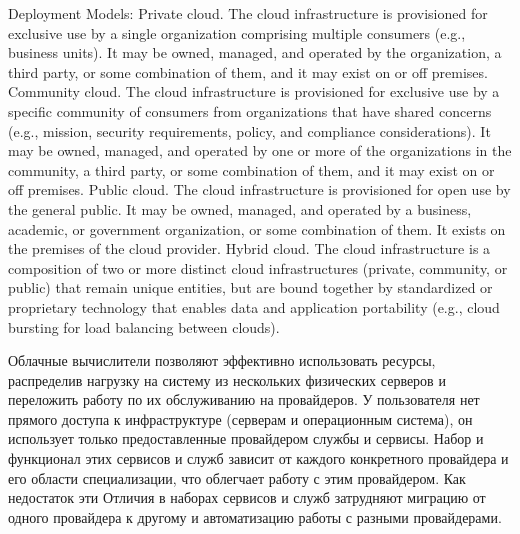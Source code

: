 \fi 
Deployment Models:
Private cloud. The cloud infrastructure is provisioned for exclusive use by a single organization
comprising multiple consumers (e.g., business units). It may be owned, managed, and
operated by the organization, a third party, or some combination of them, and it may exist
on or off premises.
Community cloud. The cloud infrastructure is provisioned for exclusive use by a specific
community of consumers from organizations that have shared concerns (e.g., mission,
security requirements, policy, and compliance considerations). It may be owned,
managed, and operated by one or more of the organizations in the community, a third
party, or some combination of them, and it may exist on or off premises.
Public cloud. The cloud infrastructure is provisioned for open use by the general public. It may be
owned, managed, and operated by a business, academic, or government organization, or
some combination of them. It exists on the premises of the cloud provider.
Hybrid cloud. The cloud infrastructure is a composition of two or more distinct cloud
infrastructures (private, community, or public) that remain unique entities, but are bound
together by standardized or proprietary technology that enables data and application
portability (e.g., cloud bursting for load balancing between clouds). 



Облачные вычислители позволяют эффективно использовать ресурсы, распределив нагрузку на систему  из нескольких физических серверов и переложить работу по их обслуживанию на провайдеров.
У пользователя нет прямого доступа к инфраструктуре (серверам и операционным система), он использует только предоставленные провайдером службы и сервисы. 
Набор и функционал этих сервисов и служб зависит от каждого конкретного провайдера и его области специализации, что облегчает работу с этим провайдером. Как недостаток эти Отличия в наборах сервисов и служб затрудняют миграцию от одного провайдера к другому и автоматизацию работы с разными провайдерами.
\fi 

